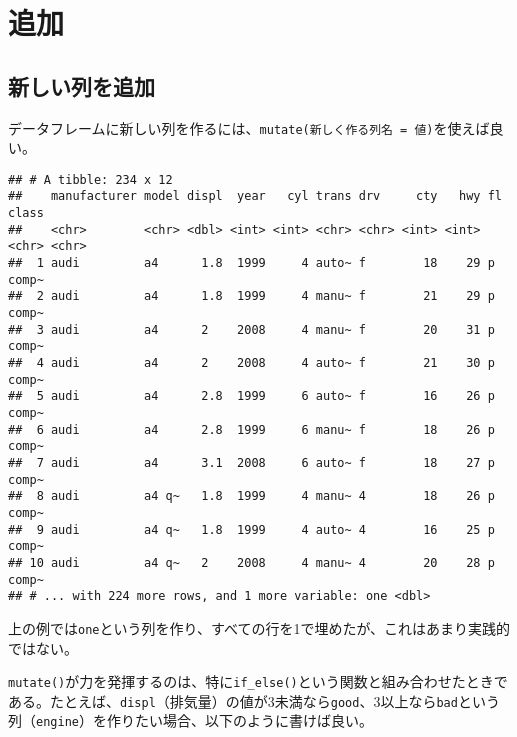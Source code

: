 \documentclass[]{book}
\newenvironment{Shaded}{\begin{snugshade}}{\end{snugshade}}
\newcommand{\KeywordTok}[1]{\textcolor[rgb]{0.13,0.29,0.53}{\textbf{#1}}}
\newcommand{\DataTypeTok}[1]{\textcolor[rgb]{0.13,0.29,0.53}{#1}}
\newcommand{\DecValTok}[1]{\textcolor[rgb]{0.00,0.00,0.81}{#1}}
\newcommand{\StringTok}[1]{\textcolor[rgb]{0.31,0.60,0.02}{#1}}
\newcommand{\CommentTok}[1]{\textcolor[rgb]{0.56,0.35,0.01}{\textit{#1}}}
\newcommand{\OperatorTok}[1]{\textcolor[rgb]{0.81,0.36,0.00}{\textbf{#1}}}
\newcommand{\NormalTok}[1]{#1}
\begin{document}
\section{追加}

\subsection{新しい列を追加}

データフレームに新しい列を作るには、\texttt{mutate(新しく作る列名\ =\ 値)}を使えば良い。

\begin{Shaded}
\end{Shaded}

\begin{verbatim}
## # A tibble: 234 x 12
##    manufacturer model displ  year   cyl trans drv     cty   hwy fl    class
##    <chr>        <chr> <dbl> <int> <int> <chr> <chr> <int> <int> <chr> <chr>
##  1 audi         a4      1.8  1999     4 auto~ f        18    29 p     comp~
##  2 audi         a4      1.8  1999     4 manu~ f        21    29 p     comp~
##  3 audi         a4      2    2008     4 manu~ f        20    31 p     comp~
##  4 audi         a4      2    2008     4 auto~ f        21    30 p     comp~
##  5 audi         a4      2.8  1999     6 auto~ f        16    26 p     comp~
##  6 audi         a4      2.8  1999     6 manu~ f        18    26 p     comp~
##  7 audi         a4      3.1  2008     6 auto~ f        18    27 p     comp~
##  8 audi         a4 q~   1.8  1999     4 manu~ 4        18    26 p     comp~
##  9 audi         a4 q~   1.8  1999     4 auto~ 4        16    25 p     comp~
## 10 audi         a4 q~   2    2008     4 manu~ 4        20    28 p     comp~
## # ... with 224 more rows, and 1 more variable: one <dbl>
\end{verbatim}

上の例では\texttt{one}という列を作り、すべての行を1で埋めたが、これはあまり実践的ではない。

\texttt{mutate()}が力を発揮するのは、特に\texttt{if\_else()}という関数と組み合わせたときである。たとえば、\texttt{displ}（排気量）の値が3未満なら\texttt{good}、3以上なら\texttt{bad}という列（\texttt{engine}）を作りたい場合、以下のように書けば良い。
\end{document}
